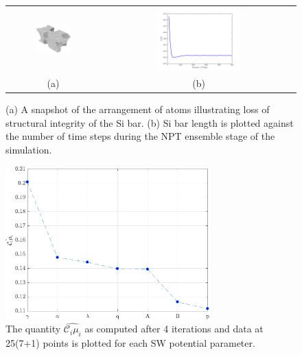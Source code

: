 \begin{figure}[p]
\begin{center}
\begin{tabular}{cc}
  \includegraphics[width=0.40\textwidth]{./Figures/unstable}
  &
  \hspace{3mm}
  \includegraphics[width=0.45\textwidth]{./Figures/lx_npt}
  \\ (a) & (b)
  \end{tabular}
\caption{(a) A snapshot of the arrangement of atoms illustrating loss of
structural integrity of the Si bar. 
(b) Si bar length is plotted against the number of time steps during
the NPT ensemble stage of the simulation.}
\label{fig:dgsm1}
\end{center}
\end{figure}

\clearpage


\begin{figure}[p]
 \begin{center}
  \includegraphics[width=0.70\textwidth]{./Figures/ub}
\caption{The quantity $\hat{\mathcal{C}_i\mu_i}$ as computed after 4 iterations and data at 25(7+1)
points is plotted for each SW potential parameter.}
\label{fig:screen}
\end{center}
\end{figure}

\clearpage




